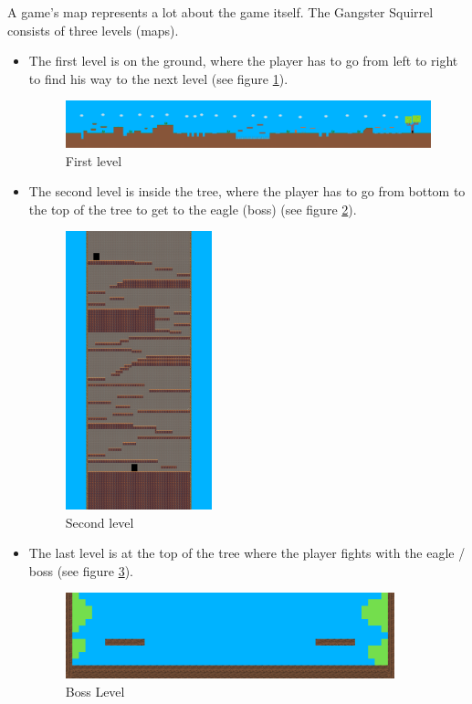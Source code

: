 \documentclass[12p]{article}
\begin{document}
A game's map represents a lot about the game itself. The Gangster Squirrel consists of three levels (maps).

\begin{itemize}
 \item The first level is on the ground, where the player has to go from left to right to find his way to the next level (see figure \ref{fig:FirstLevel}).
 
\begin{figure}[ht]
  \center
  \includegraphics[width=1\textwidth]{Documentation/level_1.png}
  \caption{First level}
  \label{fig:FirstLevel}
\end{figure}

 \item The second level is inside the tree, where the player has to go from bottom to the top of the tree to get to the eagle (boss) (see figure \ref{fig:SecondLevel}).

\begin{figure}[ht]
  \center
  \includegraphics[width=0.4\textwidth]{Documentation/level_2.png}
   \caption{Second level}
  \label{fig:SecondLevel}
\end{figure}

 \item The last level is at the top of the tree where the player fights with the eagle / boss (see figure \ref{fig:BossLevel}).
 
  \begin{figure}[ht]
      \center
      \includegraphics[width=0.9\textwidth]{Documentation/boss_level.png}
      \caption{Boss Level}
      \label{fig:BossLevel}
    \end{figure}
\end{itemize}
\end{document}
